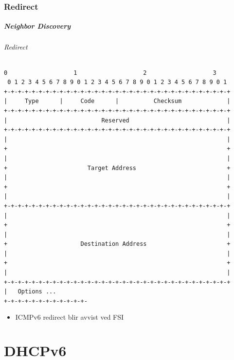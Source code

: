 \section{Redirect}
\begin{frame}[fragile]
  \frametitle{Neighbor Discovery}
  \framesubtitle{Redirect}
\begin{Verbatim}[fontsize=\tiny]
 0                   1                   2                   3
 0 1 2 3 4 5 6 7 8 9 0 1 2 3 4 5 6 7 8 9 0 1 2 3 4 5 6 7 8 9 0 1
+-+-+-+-+-+-+-+-+-+-+-+-+-+-+-+-+-+-+-+-+-+-+-+-+-+-+-+-+-+-+-+-+
|     Type      |     Code      |          Checksum             |
+-+-+-+-+-+-+-+-+-+-+-+-+-+-+-+-+-+-+-+-+-+-+-+-+-+-+-+-+-+-+-+-+
|                           Reserved                            |
+-+-+-+-+-+-+-+-+-+-+-+-+-+-+-+-+-+-+-+-+-+-+-+-+-+-+-+-+-+-+-+-+
|                                                               |
+                                                               +
|                                                               |
+                       Target Address                          +
|                                                               |
+                                                               +
|                                                               |
+-+-+-+-+-+-+-+-+-+-+-+-+-+-+-+-+-+-+-+-+-+-+-+-+-+-+-+-+-+-+-+-+
|                                                               |
+                                                               +
|                                                               |
+                     Destination Address                       +
|                                                               |
+                                                               +
|                                                               |
+-+-+-+-+-+-+-+-+-+-+-+-+-+-+-+-+-+-+-+-+-+-+-+-+-+-+-+-+-+-+-+-+
|   Options ...
+-+-+-+-+-+-+-+-+-+-+-+-
\end{Verbatim}
  \begin{itemize}
  \item ICMPv6 redirect blir avvist ved FSI
  \end{itemize}
\end{frame}

\part{DHCPv6}

\begin{frame}
  \partpage
\end{frame}

